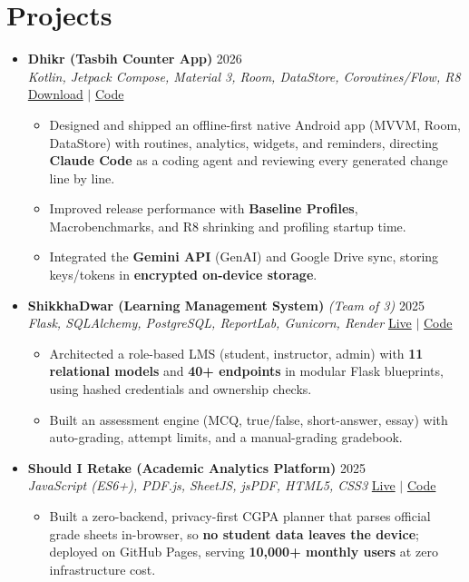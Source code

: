 \documentclass[a4paper]{article}
\newcommand{\resumeItem}[1]{
  \item\small{
    {#1 \vspace{-2pt}}
  }
}
\newcommand{\resumeItemListStart}{\begin{itemize}}
\newcommand{\resumeItemListEnd}{\end{itemize}\vspace{-5pt}}
\begin{document}
\section{Projects}
  \begin{itemize}[leftmargin=0.15in, label={}, itemsep=6pt]

    \item
    \textbf{Dhikr (Tasbih Counter App)} \hfill 2026\\
    \small\textit{Kotlin, Jetpack Compose, Material 3, Room, DataStore, Coroutines/Flow, R8} \hfill
    \href{https://github.com/badhon495/Dhikr/releases}{Download} $|$
    \href{https://github.com/badhon495/Dhikr}{Code}
    \vspace{-5pt}
    \resumeItemListStart
      \resumeItem{Designed and shipped an offline-first native Android app (MVVM, Room, DataStore) with routines, analytics, widgets, and reminders, directing \textbf{Claude Code} as a coding agent and reviewing every generated change line by line.}
      \resumeItem{Improved release performance with \textbf{Baseline Profiles}, Macrobenchmarks, and R8 shrinking and profiling startup time.}
      \resumeItem{Integrated the \textbf{Gemini API} (GenAI) and Google Drive sync, storing keys/tokens in \textbf{encrypted on-device storage}.}
    \resumeItemListEnd

    \item
    \textbf{ShikkhaDwar (Learning Management System)} \textit{\small (Team of 3)} \hfill 2025\\
    \small\textit{Flask, SQLAlchemy, PostgreSQL, ReportLab, Gunicorn, Render} \hfill
    \href{https://shikkhadwar-81r2.onrender.com/}{Live} $|$
    \href{https://github.com/nihal-kabir/ShikkhaDwar}{Code}
    \vspace{-5pt}
    \resumeItemListStart
      \resumeItem{Architected a role-based LMS (student, instructor, admin) with \textbf{11 relational models} and \textbf{40+ endpoints} in modular Flask blueprints, using hashed credentials and ownership checks.}
      \resumeItem{Built an assessment engine (MCQ, true/false, short-answer, essay) with auto-grading, attempt limits, and a manual-grading gradebook.}
    \resumeItemListEnd

    \item
    \textbf{Should I Retake (Academic Analytics Platform)} \hfill 2025\\
    \small\textit{JavaScript (ES6+), PDF.js, SheetJS, jsPDF, HTML5, CSS3} \hfill
    \href{https://badhon495.github.io/should-i-retake/}{Live} $|$
    \href{https://github.com/badhon495/should-i-retake}{Code}
    \vspace{-5pt}
    \resumeItemListStart
      \resumeItem{Built a zero-backend, privacy-first CGPA planner that parses official grade sheets in-browser, so \textbf{no student data leaves the device}; deployed on GitHub Pages, serving \textbf{10,000+ monthly users} at zero infrastructure cost.}
    \resumeItemListEnd


\end{itemize}
\end{document}
